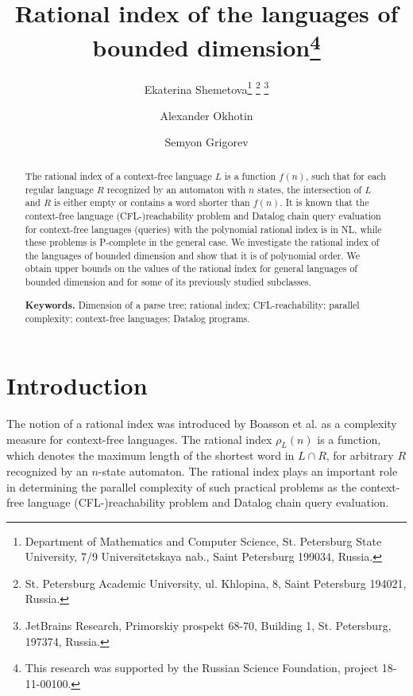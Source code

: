 \documentclass[11pt,a4paper]{article} %
\begin{document}
\sloppy

\title{Rational index of the languages of bounded dimension\footnote{%
This research was supported by the Russian Science Foundation, project 18-11-00100.}}

\author{Ekaterina Shemetova\footnote{%
Department of Mathematics and Computer Science, St. Petersburg State University, 
7/9 Universitetskaya nab., Saint Petersburg 199034, Russia.}
\footnote{%
St. Petersburg Academic University, 
ul. Khlopina, 8, Saint Petersburg 194021, Russia.}
\footnote{%
JetBrains Research,
Primorskiy prospekt 68-70, Building 1, St. Petersburg, 197374, Russia.}
\and
Alexander Okhotin\footnotemark[2]
\and
Semyon Grigorev\footnotemark[2] \footnotemark[4]
}

\maketitle


\begin{abstract}
The rational index of a context-free language  $L$ is a function $f(n)$, such that for each regular language $R$ recognized by an automaton with $n$ states, the intersection of $L$ and $R$ is either empty or contains a word shorter than $f(n)$. It is known that the context-free language (CFL-)reachability problem and Datalog chain query evaluation for context-free languages (queries) with the polynomial rational index is in NL, while these problems is P-complete in the general case. We investigate the rational index of the languages of bounded dimension and show that it is of polynomial order. We obtain upper bounds on the values of the rational index for general languages of bounded dimension and for some of its previously studied subclasses.

\textbf{Keywords.}
Dimension of a parse tree; rational index; CFL-reachability; parallel complexity; context-free languages; Datalog programs.
\end{abstract}


\section{Introduction}
\label{intro}
The notion of a rational index was introduced by Boasson et al. \cite{RatBasic} as a complexity measure for context-free languages. The rational index $\rho_L(n)$ is a function, which denotes the maximum length of the shortest word in $L \cap R$, for arbitrary $R$ recognized by an $n$-state automaton. The rational index plays an important role in determining the parallel complexity of such practical problems as the context-free language (CFL-)reachability problem and Datalog chain query evaluation.
\end{document}
